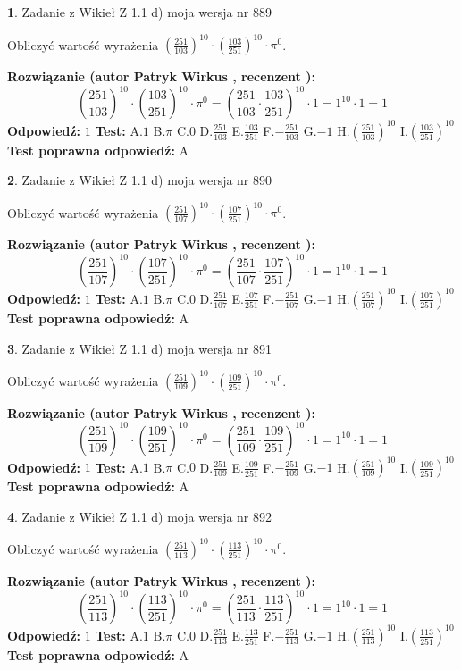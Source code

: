 \documentclass[12pt, a4paper]{article}
\theoremstyle{definition} %
\newtheorem{zad}{}
\newcommand{\zadStart}[1]{\begin{zad}#1\newline}
\newcommand{\zadStop}{\end{zad}}
\newcommand{\rozwStart}[2]{\noindent \textbf{Rozwiązanie (autor #1 , recenzent #2): }\newline}
\newcommand{\rozwStop}{\newline}
\newcommand{\odpStart}{\noindent \textbf{Odpowiedź:}\newline}
\newcommand{\odpStop}{\newline}
\newcommand{\testStart}{\noindent \textbf{Test:}\newline}
\newcommand{\testStop}{\newline}
\newcommand{\kluczStart}{\noindent \textbf{Test poprawna odpowiedź:}\newline}
\newcommand{\kluczStop}{\newline}
\begin{document}
\zadStart{Zadanie z Wikieł Z 1.1 d) moja wersja nr 889}

Obliczyć wartość wyrażenia $(\frac{251}{103})^{10} \cdot (\frac{103}{251})^{10} \cdot \pi^{0}$.
\zadStop
\rozwStart{Patryk Wirkus}{}
$$(\frac{251}{103})^{10} \cdot (\frac{103}{251})^{10} \cdot \pi^{0} = (\frac{251}{103} \cdot \frac{103}{251})^{10} \cdot 1 = 1^{10} \cdot 1 = 1$$
\rozwStop
\odpStart
$1$
\odpStop
\testStart
A.$1$ B.$\pi$ C.$0$ D.$\frac{251}{103}$ E.$\frac{103}{251}$
F.$-\frac{251}{103}$ G.$-1$
H.$(\frac{251}{103})^{10}$
I.$(\frac{103}{251})^{10}$
\testStop
\kluczStart
A
\kluczStop



\zadStart{Zadanie z Wikieł Z 1.1 d) moja wersja nr 890}

Obliczyć wartość wyrażenia $(\frac{251}{107})^{10} \cdot (\frac{107}{251})^{10} \cdot \pi^{0}$.
\zadStop
\rozwStart{Patryk Wirkus}{}
$$(\frac{251}{107})^{10} \cdot (\frac{107}{251})^{10} \cdot \pi^{0} = (\frac{251}{107} \cdot \frac{107}{251})^{10} \cdot 1 = 1^{10} \cdot 1 = 1$$
\rozwStop
\odpStart
$1$
\odpStop
\testStart
A.$1$ B.$\pi$ C.$0$ D.$\frac{251}{107}$ E.$\frac{107}{251}$
F.$-\frac{251}{107}$ G.$-1$
H.$(\frac{251}{107})^{10}$
I.$(\frac{107}{251})^{10}$
\testStop
\kluczStart
A
\kluczStop



\zadStart{Zadanie z Wikieł Z 1.1 d) moja wersja nr 891}

Obliczyć wartość wyrażenia $(\frac{251}{109})^{10} \cdot (\frac{109}{251})^{10} \cdot \pi^{0}$.
\zadStop
\rozwStart{Patryk Wirkus}{}
$$(\frac{251}{109})^{10} \cdot (\frac{109}{251})^{10} \cdot \pi^{0} = (\frac{251}{109} \cdot \frac{109}{251})^{10} \cdot 1 = 1^{10} \cdot 1 = 1$$
\rozwStop
\odpStart
$1$
\odpStop
\testStart
A.$1$ B.$\pi$ C.$0$ D.$\frac{251}{109}$ E.$\frac{109}{251}$
F.$-\frac{251}{109}$ G.$-1$
H.$(\frac{251}{109})^{10}$
I.$(\frac{109}{251})^{10}$
\testStop
\kluczStart
A
\kluczStop



\zadStart{Zadanie z Wikieł Z 1.1 d) moja wersja nr 892}

Obliczyć wartość wyrażenia $(\frac{251}{113})^{10} \cdot (\frac{113}{251})^{10} \cdot \pi^{0}$.
\zadStop
\rozwStart{Patryk Wirkus}{}
$$(\frac{251}{113})^{10} \cdot (\frac{113}{251})^{10} \cdot \pi^{0} = (\frac{251}{113} \cdot \frac{113}{251})^{10} \cdot 1 = 1^{10} \cdot 1 = 1$$
\rozwStop
\odpStart
$1$
\odpStop
\testStart
A.$1$ B.$\pi$ C.$0$ D.$\frac{251}{113}$ E.$\frac{113}{251}$
F.$-\frac{251}{113}$ G.$-1$
H.$(\frac{251}{113})^{10}$
I.$(\frac{113}{251})^{10}$
\testStop
\kluczStart
A
\kluczStop
\end{document}
